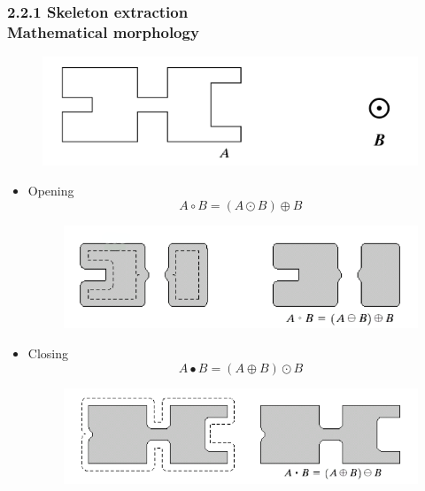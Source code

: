 \documentclass[notheorems,serif,table,compress]{beamer}  %
\begin{document}
\begin{frame}
\frametitle{2.2.1 Skeleton extraction \\ \normalsize{Mathematical morphology}}
            \begin{figure}
              \centering
              \includegraphics[width=0.35\linewidth]{yuan} 
            \end{figure}
    \begin{itemize}
        \item Opening
           \begin{displaymath}
             A \circ B=(A \odot B)\oplus B
           \end{displaymath} 
           \begin{figure}
              \centering
              \includegraphics[width=0.52\linewidth]{open} 
            \end{figure}
        \item Closing
            \begin{displaymath}
             A \bullet B=(A \oplus B)\odot B
           \end{displaymath} 
           \begin{figure}
              \centering
              \includegraphics[width=0.52\linewidth]{close} 
            \end{figure}
    \end{itemize}
\end{frame}
\end{document}
